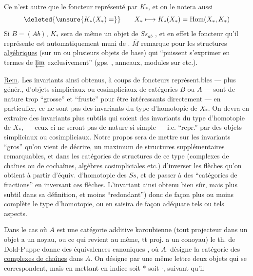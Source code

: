 Ce n'est autre que le foncteur représenté par $K_*$, et on le notera aussi
\[
 \deleted{\unsure{K_*(X_*)=}}
 \qquad X_*\longmapsto K_*(X_*)=\operatorname{Hom}(X_*,K_*)
\]
Si $B=(Ab)$, $K_*$ sera de même un objet de $Ss_{ab}$
, et en effet le foncteur qu'il représente est
automatiquement muni de 
. $\overline M$ remarque pour les structures
\uline{algébriques} (sur un ou plusieurs objets de base) qui
``puissent s'exprimer en termes de $\varprojlim$ exclusivement''
(gps, , anneaux, modules sur
 etc.).

\uline{Rem}. Les  invariants ainsi obtenus,
à coups de foncteurs représent.bles --- plus génér., d'objets simpliciaux
ou cosimpliciaux de catégories $B$ ou $A$ --- sont de nature trop
``grosse'' et ``fruste'' pour être intéressants directement --- en
particulier, ce ne sont pas des invariants du type d'homotopie de $X_*$.
On devra en extraire des invariants plus subtils qui soient des invariants
du type d'homotopie de $X_*$, --- ceux-ci ne seront pas de nature si simple
--- i.e. ``repr.'' par des objets simpliciaux ou cosimpliciaux.
Notre propos sera de mettre sur les invariants ``gros'' qu'on vient de décrire,
un maximum de structures supplémentaires remarquables, et dans les catégories
de structures de ce type (complexes de chaînes ou de cochaînes, algèbres
cosimpliciales etc.) d'inverser les flèches qu'on obtient à partir d'équiv.
d'homotopie des $Ss$, et de passer à des ``catégories de fractions'' en
inversant ces flèches. L'invariant ainsi obtenu
bien sûr, mais plus subtil dans sa définition, et moins ``redondant'')
 donc de façon plus ou moins complète le type
d'homotopie, ou en saisira de façon adéquate tels ou tels aspects.

Dans le cas où $A$ est une catégorie additive karoubienne (tout projecteur
dans un objet a un noyau, ou ce qui revient au même, tt proj. a un conoyau)
le th. de Dold-Puppe donne des équivalences canoniques
,
où $A_{\cdot}$ désigne la catégorie des \uline{complexes de chaînes}
dans $A$. On désigne par une même lettre  deux objets
qui se correspondent, mais en mettant en indice soit $*$ soit $\cdot$,
suivant qu'il
